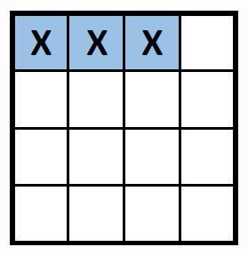 \begin{frame}
\begin{minipage}{0.47\textwidth}
\begin{figure}
{\begin{minipage}{0.49\textwidth}
						\includegraphics[width=\linewidth]{images/placement_rowscan}
					\end{minipage}\hfill
				}
			\end{figure}
		\end{minipage}\hfill
		\begin{minipage}{0.47\textwidth}
			\begin{figure}
			\end{figure}
		\end{minipage}\hfill
	\end{frame}
	
